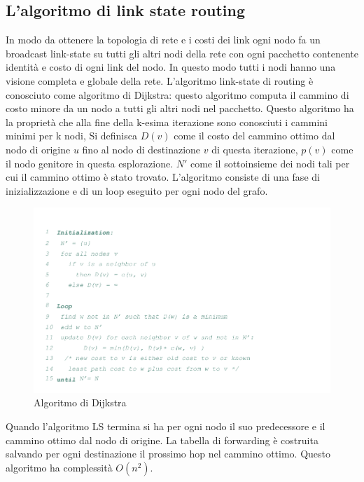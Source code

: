 \subsection{L'algoritmo di link state routing}
In modo da ottenere la topologia di rete e i costi dei link ogni nodo fa un broadcast link-state su tutti gli altri nodi della rete con ogni pacchetto 
contenente identit\`a e costo di ogni link del nodo. In questo modo tutti i nodi hanno una visione completa e globale della rete. L'algoritmo link-state di
routing \`e conosciuto come algoritmo di Dijkstra: questo algoritmo computa il cammino di costo minore da un nodo a tutti gli altri nodi nel pacchetto. 
Questo algoritmo ha la propriet\`a che alla fine della k-esima iterazione sono conosciuti i cammini minimi per k nodi, Si definisca $D(v)$ come il costo 
del cammino ottimo dal nodo di origine $u$ fino al nodo di destinazione $v$ di questa iterazione, $p(v)$ come il nodo genitore in questa esplorazione. $N'$
come il sottoinsieme dei nodi tali per cui il cammino ottimo \`e stato trovato. L'algoritmo consiste di una fase di inizializzazione e di un loop eseguito
per ogni nodo del grafo. 
\begin{figure}[h]
\includegraphics[width=\textwidth]{Pictures/AlgoritmoDijkstra.png}
\caption{Algoritmo di Dijkstra}
\end{figure}
Quando l'algoritmo LS termina si ha per ogni nodo il suo predecessore e il cammino ottimo dal nodo di origine. La tabella di forwarding \`e costruita 
salvando per ogni destinazione il prossimo hop nel cammino ottimo. Questo algoritmo ha complessit\`a $O(n^2)$. 
